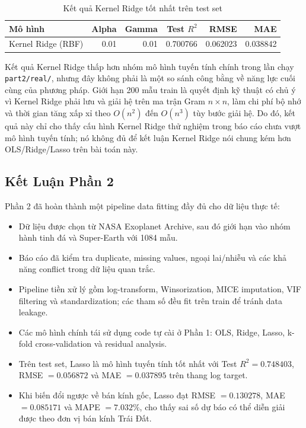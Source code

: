 \begin{table}[H]
\centering
\caption{Kết quả Kernel Ridge tốt nhất trên test set}
\label{tab:part2_kernel_result}
\begin{tabular}{@{}lrrrrr@{}}
\hline
\textbf{Mô hình} & \textbf{Alpha} & \textbf{Gamma} & \textbf{Test $R^2$} & \textbf{RMSE} & \textbf{MAE} \\
\hline
Kernel Ridge (RBF) & 0.01 & 0.01 & 0.700766 & 0.062023 & 0.038842 \\
\hline
\end{tabular}
\end{table}

Kết quả Kernel Ridge thấp hơn nhóm mô hình tuyến tính chính trong lần chạy \texttt{part2/real/},
nhưng đây không phải là một so sánh công bằng về năng lực cuối cùng của phương pháp. Giới hạn
200 mẫu train là quyết định kỹ thuật có chủ ý vì Kernel Ridge phải lưu và giải hệ trên ma trận
Gram $n\times n$, làm chi phí bộ nhớ và thời gian tăng xấp xỉ theo $O(n^2)$ đến $O(n^3)$ tùy bước
giải hệ. Do đó, kết quả này chỉ cho thấy cấu hình Kernel Ridge thử nghiệm trong báo cáo chưa vượt
mô hình tuyến tính; nó không đủ để kết luận Kernel Ridge nói chung kém hơn OLS/Ridge/Lasso trên
bài toán này.

\FloatBarrier

\subsection{Kết Luận Phần 2}

Phần 2 đã hoàn thành một pipeline data fitting đầy đủ cho dữ liệu thực tế:
\begin{itemize}
    \item Dữ liệu được chọn từ NASA Exoplanet Archive, sau đó giới hạn vào nhóm hành tinh đá và
          Super-Earth với 1084 mẫu.
    \item Báo cáo đã kiểm tra duplicate, missing values, ngoại lai/nhiễu và các khả năng conflict
          trong dữ liệu quan trắc.
    \item Pipeline tiền xử lý gồm log-transform, Winsorization, MICE imputation, VIF filtering và
          standardization; các tham số đều fit trên train để tránh data leakage.
    \item Các mô hình chính tái sử dụng code tự cài ở Phần 1: OLS, Ridge, Lasso, k-fold
          cross-validation và residual analysis.
    \item Trên test set, Lasso là mô hình tuyến tính tốt nhất với Test $R^2=0.748403$,
          RMSE $=0.056872$ và MAE $=0.037895$ trên thang log target.
    \item Khi biến đổi ngược về bán kính gốc, Lasso đạt RMSE $=0.130278$, MAE $=0.085171$ và
          MAPE $=7.032\%$, cho thấy sai số dự báo có thể diễn giải được theo đơn vị bán kính
          Trái Đất.
\end{itemize}

